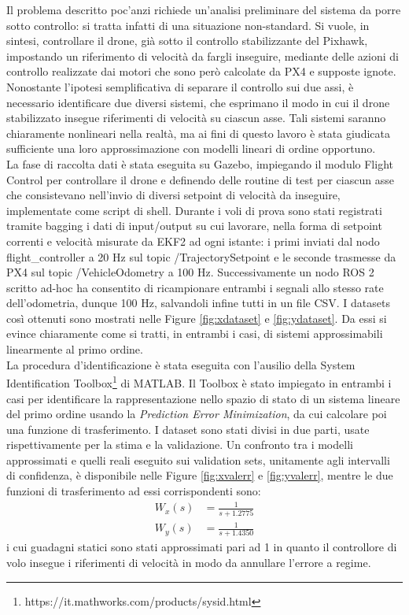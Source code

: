 \indent Il problema descritto poc'anzi richiede un'analisi preliminare del sistema da porre sotto controllo: si tratta infatti di una situazione non-standard. Si vuole, in sintesi, controllare il drone, già sotto il controllo stabilizzante del Pixhawk, impostando un riferimento di velocità da fargli inseguire, mediante delle azioni di controllo realizzate dai motori che sono però calcolate da PX4 e supposte ignote. Nonostante l'ipotesi semplificativa di separare il controllo sui due assi, è necessario identificare due diversi sistemi, che esprimano il modo in cui il drone stabilizzato insegue riferimenti di velocità su ciascun asse. Tali sistemi saranno chiaramente nonlineari nella realtà, ma ai fini di questo lavoro è stata giudicata sufficiente una loro approssimazione con modelli lineari di ordine opportuno.\\
La fase di raccolta dati è stata eseguita su Gazebo, impiegando il modulo Flight Control per controllare il drone e definendo delle routine di test per ciascun asse che consistevano nell'invio di diversi setpoint di velocità da inseguire, implementate come script di shell. Durante i voli di prova sono stati registrati tramite bagging i dati di input/output su cui lavorare, nella forma di setpoint correnti e velocità misurate da EKF2 ad ogni istante: i primi inviati dal nodo flight\_controller a 20 Hz sul topic /TrajectorySetpoint e le seconde trasmesse da PX4 sul topic /VehicleOdometry a 100 Hz. Successivamente un nodo ROS 2 scritto ad-hoc ha consentito di ricampionare entrambi i segnali allo stesso rate dell'odometria, dunque 100 Hz, salvandoli infine tutti in un file CSV. I datasets così ottenuti sono mostrati nelle Figure \ref{fig:xdataset} e \ref{fig:ydataset}. Da essi si evince chiaramente come si tratti, in entrambi i casi, di sistemi approssimabili linearmente al primo ordine.\\
La procedura d'identificazione è stata eseguita con l'ausilio della System Identification Toolbox\footnote{https://it.mathworks.com/products/sysid.html} di MATLAB. Il Toolbox è stato impiegato in entrambi i casi per identificare la rappresentazione nello spazio di stato di un sistema lineare del primo ordine usando la \emph{Prediction Error Minimization}, da cui calcolare poi una funzione di trasferimento. I dataset sono stati divisi in due parti, usate rispettivamente per la stima e la validazione. Un confronto tra i modelli approssimati e quelli reali eseguito sui validation sets, unitamente agli intervalli di confidenza, è disponibile nelle Figure \ref{fig:xvalerr} e \ref{fig:yvalerr}, mentre le due funzioni di trasferimento ad essi corrispondenti sono:
\begin{subequations}
    \begin{align}
        W_x(s) &= \frac{1}{s+1.2775}\\
        W_y(s) &= \frac{1}{s+1.4350}
    \end{align}
\end{subequations}
i cui guadagni statici sono stati approssimati pari ad 1 in quanto il controllore di volo insegue i riferimenti di velocità in modo da annullare l'errore a regime.

